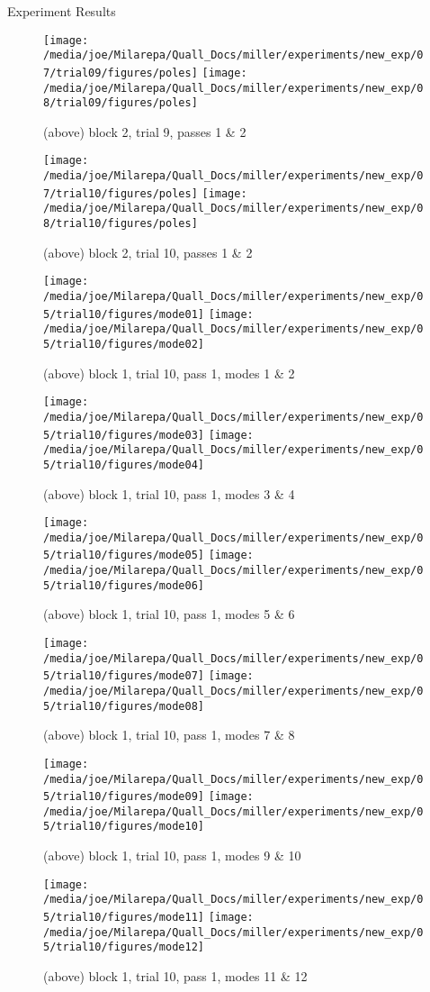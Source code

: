 \documentclass[a4paper,10pt]{report}
\numberwithin{equation}{section}
\begin{document}
{\begin{chapter}
\begin{section}{Experiment Results}
\begin{singlespace}
\begin{figure}[h]
\texttt{[image: /media/joe/Milarepa/Quall\_Docs/miller/experiments/new\_exp/07/trial09/figures/poles]}
\texttt{[image: /media/joe/Milarepa/Quall\_Docs/miller/experiments/new\_exp/08/trial09/figures/poles]}
\caption{(above) block 2, trial 9, passes 1 \& 2}
\texttt{[image: /media/joe/Milarepa/Quall\_Docs/miller/experiments/new\_exp/07/trial10/figures/poles]}
\texttt{[image: /media/joe/Milarepa/Quall\_Docs/miller/experiments/new\_exp/08/trial10/figures/poles]}
\caption{(above) block 2, trial 10, passes 1 \& 2}
\end{figure}
\begin{figure}[h]
\texttt{[image: /media/joe/Milarepa/Quall\_Docs/miller/experiments/new\_exp/05/trial10/figures/mode01]}
\texttt{[image: /media/joe/Milarepa/Quall\_Docs/miller/experiments/new\_exp/05/trial10/figures/mode02]}
\caption{(above) block 1, trial 10, pass 1, modes 1 \& 2}
\texttt{[image: /media/joe/Milarepa/Quall\_Docs/miller/experiments/new\_exp/05/trial10/figures/mode03]}
\texttt{[image: /media/joe/Milarepa/Quall\_Docs/miller/experiments/new\_exp/05/trial10/figures/mode04]}
\caption{(above) block 1, trial 10, pass 1, modes 3 \& 4}
\texttt{[image: /media/joe/Milarepa/Quall\_Docs/miller/experiments/new\_exp/05/trial10/figures/mode05]}
\texttt{[image: /media/joe/Milarepa/Quall\_Docs/miller/experiments/new\_exp/05/trial10/figures/mode06]}
\caption{(above) block 1, trial 10, pass 1, modes 5 \& 6}
\end{figure}
\begin{figure}[h]
\texttt{[image: /media/joe/Milarepa/Quall\_Docs/miller/experiments/new\_exp/05/trial10/figures/mode07]}
\texttt{[image: /media/joe/Milarepa/Quall\_Docs/miller/experiments/new\_exp/05/trial10/figures/mode08]}
\caption{(above) block 1, trial 10, pass 1, modes 7 \& 8}
\texttt{[image: /media/joe/Milarepa/Quall\_Docs/miller/experiments/new\_exp/05/trial10/figures/mode09]}
\texttt{[image: /media/joe/Milarepa/Quall\_Docs/miller/experiments/new\_exp/05/trial10/figures/mode10]}
\caption{(above) block 1, trial 10, pass 1, modes 9 \& 10}
\texttt{[image: /media/joe/Milarepa/Quall\_Docs/miller/experiments/new\_exp/05/trial10/figures/mode11]}
\texttt{[image: /media/joe/Milarepa/Quall\_Docs/miller/experiments/new\_exp/05/trial10/figures/mode12]}
\caption{(above) block 1, trial 10, pass 1, modes 11 \& 12}
\end{figure}
\begin{figure}[h]

\end{figure}
\end{singlespace}
\end{section}
\end{chapter}}
\end{document}
